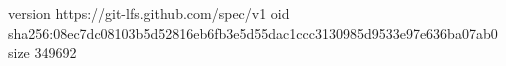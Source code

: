 version https://git-lfs.github.com/spec/v1
oid sha256:08ec7dc08103b5d52816eb6fb3e5d55dac1ccc3130985d9533e97e636ba07ab0
size 349692
